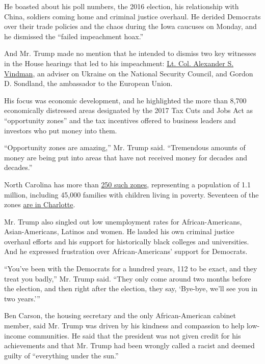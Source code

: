 He boasted about his poll numbers, the 2016 election, his relationship
with China, soldiers coming home and criminal justice overhaul. He
derided Democrats over their trade policies and the chaos during the
Iowa caucuses on Monday, and he dismissed the ``failed impeachment
hoax.''

And Mr. Trump made no mention that he intended to dismiss two key
witnesses in the House hearings that led to his impeachment:
\href{https://www.nytimes.com/2019/11/19/us/politics/alexander-vindman-impeachment-testimony.html}{Lt.
Col. Alexander S. Vindman}, an adviser on Ukraine on the National
Security Council, and Gordon D. Sondland, the ambassador to the European
Union.

His focus was economic development, and he highlighted the more than
8,700 economically distressed areas designated by the 2017 Tax Cuts and
Jobs Act as ``opportunity zones'' and the tax incentives offered to
business leaders and investors who put money into them.

``Opportunity zones are amazing,'' Mr. Trump said. ``Tremendous amounts
of money are being put into areas that have not received money for
decades and decades.''

North Carolina has more than
\href{https://public.nccommerce.com/oz/}{250 such zones}, representing a
population of 1.1 million, including 45,000 families with children
living in poverty. Seventeen of the zones
\href{https://charlottenc.gov/ED/Development/Pages/OpportunityZones.aspx}{are
in Charlotte}.

Mr. Trump also singled out low unemployment rates for African-Americans,
Asian-Americans, Latinos and women. He lauded his own criminal justice
overhaul efforts and his support for historically black colleges and
universities. And he expressed frustration over African-Americans'
support for Democrats.

``You've been with the Democrats for a hundred years, 112 to be exact,
and they treat you badly,'' Mr. Trump said. ``They only come around two
months before the election, and then right after the election, they say,
`Bye-bye, we'll see you in two years.'''

Ben Carson, the housing secretary and the only African-American cabinet
member, said Mr. Trump was driven by his kindness and compassion to help
low-income communities. He said that the president was not given credit
for his achievements and that Mr. Trump had been wrongly called a racist
and deemed guilty of ``everything under the sun.''

